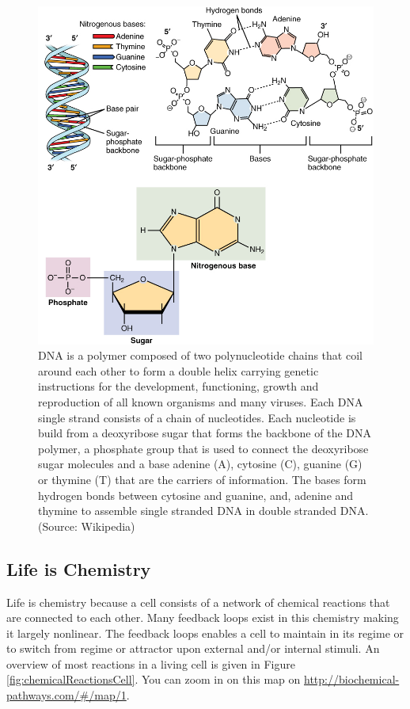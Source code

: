 \documentclass[
  11pt,
]{book}
\begin{document}
\begin{figure}

{\centering \includegraphics[width=0.5\linewidth]{./figs/DNA_Nucleotides} 

}

\caption{DNA is a polymer composed of two polynucleotide chains that coil around each other to form a double helix carrying genetic instructions for the development, functioning, growth and reproduction of all known organisms and many viruses. Each DNA single strand consists of a chain of nucleotides. Each nucleotide is build from a deoxyribose sugar that forms the backbone of the DNA  polymer, a phosphate group that is used to connect the deoxyribose sugar molecules and a base adenine (A), cytosine (C), guanine (G) or thymine (T) that are the carriers of information. The bases form hydrogen bonds between cytosine and guanine, and, adenine and thymine to assemble single stranded DNA in double stranded DNA. (Source: Wikipedia)}\label{fig:DNA}
\end{figure}

\newpage

\hypertarget{life-is-chemistry}{%
\subsection{Life is Chemistry}\label{life-is-chemistry}}

Life is chemistry because a cell consists of a network of chemical reactions that are connected to each other. Many feedback loops exist in this chemistry making it largely nonlinear. The feedback loops enables a cell to maintain in its regime or to switch from regime or attractor upon external and/or internal stimuli. An overview of most reactions in a living cell is given in Figure \ref{fig:chemicalReactionsCell}. You can zoom in on this map on \url{http://biochemical-pathways.com/\#/map/1}.
\end{document}
